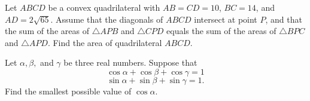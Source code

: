 \documentclass[11pt]{article}
\theoremstyle{definition}
\begin{document}
\begin{question}[name={2018 AIME II, \href{https://artofproblemsolving.com/community/c4p10083420}{Problem 12}}]
	Let $ABCD$ be a convex quadrilateral with $AB=CD=10$, $BC=14$, and $AD=2\sqrt{65}$. Assume that the diagonals of $ABCD$ intersect at point $P$, and that the sum of the areas of $\triangle APB$ and $\triangle CPD$ equals the sum of the areas of $\triangle BPC$ and $\triangle APD$. Find the area of quadrilateral $ABCD$.
\end{question}


%	







\begin{question}[name={2018 HMMT, Algebra \& Number Theory, \href{https://artofproblemsolving.com/community/c129h1590229p9853117}{Problem 6}}]
	Let $\alpha,\beta,$ and $\gamma$ be three real numbers. Suppose that$$\cos\alpha+\cos\beta+\cos\gamma=1$$$$\sin\alpha+\sin\beta+\sin\gamma=1.$$Find the smallest possible value of $\cos \alpha.$
\end{question}
\end{document}
